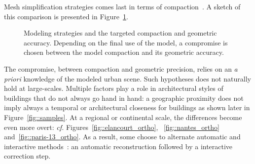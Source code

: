             Mesh simplification strategies comes last in terms of compaction~\parencite{zhou20102,verdie2015lod}.
            A sketch of this comparison is presented in Figure~\ref{fig::modeling_strategies}.\\
            \begin{figure}[htpb]
                \centering
                            
                \caption[
                    Modeling strategies and the targeted compaction and geometric accuracy.
                ]{
                    \label{fig::modeling_strategies}
                    Modeling strategies and the targeted compaction and geometric accuracy.
                    Depending on the final use of the model, a compromise is chosen between the model compaction and its geometric accuracy.
                }
            \end{figure}
            The compromise, between compaction and geometric precision, relies on an \textit{a priori} knowledge of the modeled urban scene.
            Such hypotheses does not naturally hold at large-scales.
            Multiple factors play a role in architectural styles of buildings that do not always go hand in hand:
            a geographic proximity does not imply always a temporal or architectural closeness for buildings as shown later in Figure~\ref{fig::samples}.
            At a regional or continental scale, the differences become even more overt: \textit{cf.} Figures~\ref{fig::elancourt_ortho}, ~\ref{fig::nantes_ortho} and~\ref{fig::paris-13_ortho}.
            As a result, some choose to alternate automatic and interactive methods~\parencite{musialski2013survey}: an automatic reconstruction followed by a interactive correction step.
        
